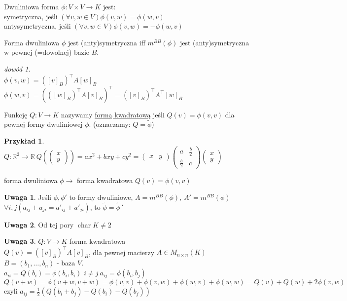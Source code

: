 \documentclass[10pt]{article}
\theoremstyle{definition}
\theoremstyle{definition}
\theoremstyle{definition}
\theoremstyle{definition}
\theoremstyle{remark}
\newtheorem*{dd}{dowód}
\theoremstyle{definition}
\newtheorem*{uw}{Uwaga}
\theoremstyle{definition}
\theoremstyle{definition}
\theoremstyle{definition}
\newtheorem*{prz}{Przykład}
\theoremstyle{definition}
\begin{document}
\begin{df} 
    Dwuliniowa forma $\phi: V \times V \to K$ jest: \\ 
        symetryczna, jeśli $(\forall v,w \in V) \phi(v,w) = \phi(w,v)$ \\ 
        antysymetryczna, jeśli $(\forall v,w \in V) \phi(v,w) = - \phi(w,v)$
\end{df} 
\begin{ft} 
    Forma dwuliniowa $\phi$ jest (anty)symetryczna iff $m^{BB} (\phi)$ jest 
    (anty)symetryczna w pewnej (=dowolnej) bazie $B$. 
\end{ft} 
\begin{dd} ~\\ 
    $\phi(v,w) = ([v]_B)^\top A [w]_B$ \\ 
    $\phi(w,v) = (([w]_B)^\top A [v]_B)^\top = ([v]_B)^\top A^\top [w]_B$
\end{dd} 
\begin{df} 
    Funkcję $Q: V \to K$ nazywamy \underline{formą kwadratową} jeśli $Q(v) = \phi(v,v)$ 
    dla pewnej formy dwuliniowej $\phi$. (oznaczamy: $Q = \widetilde \phi$)
\end{df} 
\begin{prz} 
    $Q: \mathbb R^2 \to \mathbb R \ Q(\begin{pmatrix} x \\ y \end{pmatrix}) = ax^2 +bxy+ 
    cy^2 = \begin{pmatrix} x & y \end{pmatrix} \begin{pmatrix} a & \frac{b}{2} \\ 
    \frac{b}{2} & c \end{pmatrix} \begin{pmatrix} x \\ y \end{pmatrix}$
\end{prz} 
forma dwuliniowa $\phi \longrightarrow$ forma kwadratowa $Q(v) = \phi(v,v)$
\begin{uw} Jeśli $\phi,\phi'$ to formy dwuliniowe, $A = m^{BB}(\phi),\ A'=m^{BB}
(\phi)$ \\ 
$\forall i,j (a_{ij} + a_{ji} = a'_{ij} + a'_{ji})$, to $\widetilde\phi = \widetilde
{\phi}\, '$
\end{uw} 
\begin{uw} Od tej pory $\operatorname{char} K \neq 2$ \end{uw}
\begin{uw} $Q: V \to K$ forma kwadratowa \\ 
    $Q(v) = ([v]_B)^\top A [v]_B$, dla pewnej macierzy $A \in M_{n \times n}(K)$
    $B = (b_1,\ldots,b_n)$ - baza $V$. \\ 
    $a_{ii} = Q(b_i) = \phi(b_i,b_i)$
    $i \neq j \ a_{ij} = \phi(b_i,b_j)$ \\ 
    $Q(v+w) = \phi(v+w,v+w) = \phi(v,v)+\phi(v,w)+\phi(w,v)+\phi(w,w) = Q(v)
    + Q(w) + 2\phi(v,w)$
    czyli $a_{ij} = \frac{1}{2} (Q(b_i+b_j) - Q(b_i) - Q(b_j))$
\end{uw} 
\end{document}
